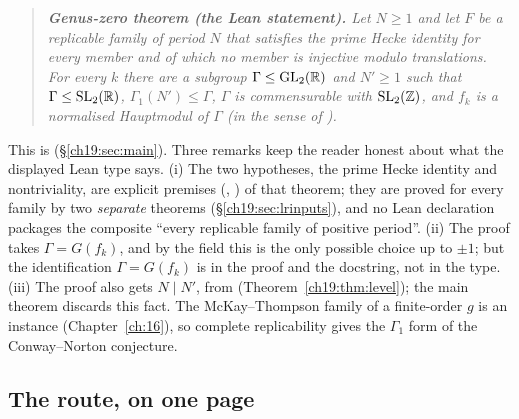\begin{quote}\itshape
\textbf{Genus-zero theorem (the Lean statement).}  Let $N\ge1$ and let $F$ be a replicable family of period $N$ that satisfies
the prime Hecke identity for every member and of which no member is injective modulo translations.  For every $k$ there are a
subgroup $\Gamma\le\mathrm{GL}_2(\mathbb{R})$ and $N'\ge1$ such that $\Gamma\le\mathrm{SL}_2(\mathbb{R})$, $\Gamma_1(N')\le\Gamma$, $\Gamma$ is commensurable with
$\mathrm{SL}_2(\mathbb{Z})$, and $f_k$ is a normalised Hauptmodul of $\Gamma$ (in the sense of ).
\end{quote}
This is  (\S\ref{ch19:sec:main}).  Three remarks keep the reader honest about
what the displayed Lean type says.  (i) The two hypotheses, the prime Hecke identity and nontriviality, are explicit premises
(, ) of that theorem; they are proved for every family by two \emph{separate} theorems
(\S\ref{ch19:sec:lrinputs}), and no Lean declaration packages the composite ``every replicable family of positive period''.
(ii) The proof takes $\Gamma=G(f_k)$, and by the field  this is the only possible choice up to $\pm1$; but the
identification $\Gamma=G(f_k)$ is in the proof and the docstring, not in the type.  (iii) The proof also gets $N\mid N'$, from
 (Theorem~\ref{ch19:thm:level}); the main theorem discards this fact.  The McKay--Thompson family of a finite-order $g$ is an instance (Chapter~\ref{ch:16}), so
complete replicability gives the $\Gamma_1$ form of the Conway--Norton conjecture.

\subsection{The route, on one page}\label{ch19:sec:route}

